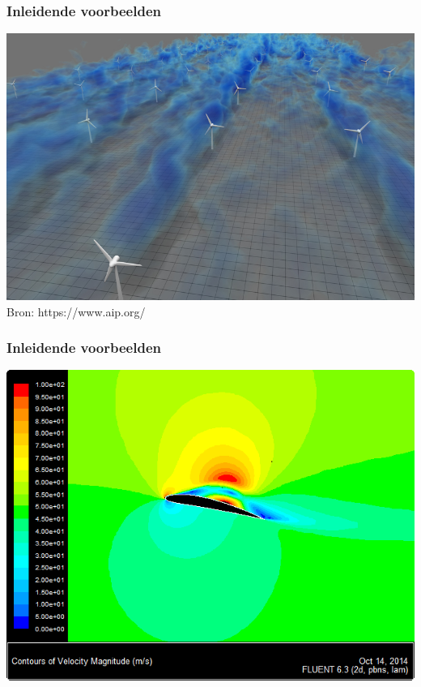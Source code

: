 \documentclass[t]{beamer}
\begin{document}
	\begin{frame}
		\frametitle{Inleidende voorbeelden}
		\center
    	\includegraphics[height=0.7\textheight]{fig/inleiding/JRSE-Stevens-wind_farms}\\
    	\footnotesize{Bron: https://www.aip.org/}
  	\end{frame}
	\begin{frame}
		\frametitle{Inleidende voorbeelden}
		\center
    	\includegraphics[height=0.7\textheight]{fig/inleiding/NACA4412_velocity_12deg}\\
  	\end{frame}
\end{document}
